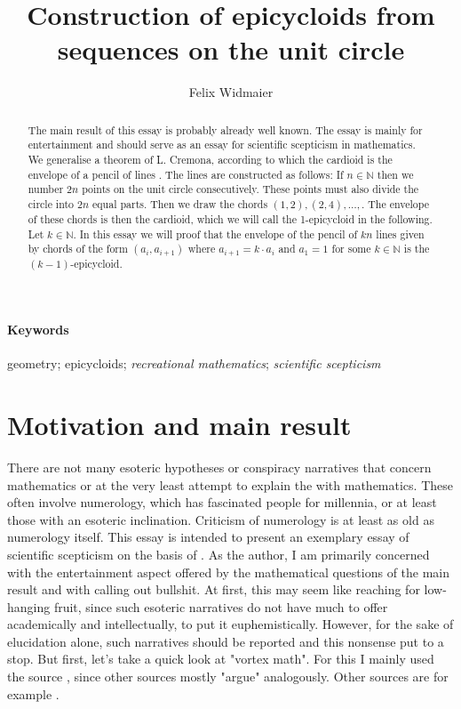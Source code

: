 \documentclass{article}
\title{Construction of epicycloids from sequences on the unit circle}
\author{Felix Widmaier}
\date{} %
\newcommand{\N}{\mathbb{N}}
\begin{document}
\maketitle

\begin{abstract} 
\noindent
The main result of this essay is probably already well known. The essay is mainly for entertainment and should serve as an essay 
for scientific scepticism in mathematics. We generalise a theorem of L. Cremona, according to which the cardioid is the envelope of 
a pencil of lines \cite{cremona}. The lines are constructed as follows: If $n\in\mathbb{N}$ then we number $2n$ points on the 
unit circle consecutively. These points must also divide the circle into $2n$ equal parts. Then we draw the chords 
$(1,2), (2,4),\ldots,$. The envelope of these chords is then the cardioid, which we will call the 1-epicycloid in the following. 
Let $k\in\N$. In this essay we will proof that the envelope of the pencil of $kn$ lines given by chords of the form 
$(a_i, a_{i+1})$ where $a_{i+1} = k\cdot a_i$  and $a_1 =1$ for some $k\in\mathbb{N}$ is the $(k-1)$-epicycloid.
\end{abstract}

\noindent\paragraph{Keywords}{geometry; epicycloids; \textit{recreational mathematics}; \textit{scientific scepticism}}\\


\section{Motivation and main result}
There are not many esoteric hypotheses or conspiracy narratives that concern mathematics or at the very least attempt to explain the  
with mathematics. These often involve numerology, which has fascinated people for millennia, or at least those with an esoteric inclination. 
Criticism of numerology is at least as old as numerology itself. This essay is intended to present an exemplary essay of scientific scepticism 
on the basis of . As the author, I am primarily concerned with the entertainment aspect offered by the mathematical questions 
of the main result and with calling out bullshit. At first, this may seem like reaching for low-hanging fruit, since such esoteric narratives do 
not have much to offer academically and intellectually, to put it euphemistically. However, for the sake of elucidation alone, such narratives 
should be reported and this nonsense put to a stop. But first, let's take a quick look at "vortex math". For this I mainly used the 
source \cite{omnia}, since other sources mostly "argue" analogously. Other sources are for example \cite{powell,steinhauser}.\newline
\end{document}
